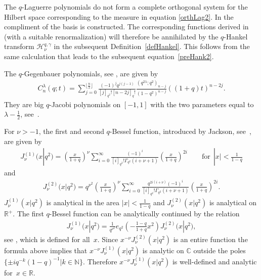 \documentclass[pdftex]{sigma}
\newcommand{\mR}{\mathbb{R}}
\newcommand{\mC}{\mathbb{C}}
\newcommand{\mN}{\mathbb{N}}
\newcommand{\cH}{\mathcal{H}}
\numberwithin{equation}{section}
\begin{document}
\begin{remark}
The $q$-Laguerre polynomials do not form a complete orthogonal system for the Hilbert space corresponding to the measure in equation \eqref{orthLag2}. In \cite{MR1803885} the compliment of the basis is constructed. The corresponding functions derived in~\cite[Section~4]{MR1803885} (with a suitable renormalization) will therefore be annihilated by the $q$-Hankel transform $\cH_\nu^{q,\gamma}$ in the subsequent Def\/inition~\ref{defHankel}. This follows from the same calculation that leads to the subsequent equation~\eqref{preHank2}.
\end{remark}

The $q$-Gegenbauer polynomials, see \cite[equation~(2.19)]{MR1340930}, are given by
\begin{gather}
\label{qGeg}
C^\lambda_n(q;t)=\sum_{j=0}^{\lfloor\frac{n}{2}\rfloor}\frac{(-1)^jq^{j(j-1)}}{[j]_{q^2}![n-2j]_q!}
\frac{(q^{2\lambda};q^2)_{n-j}}{(1-q^2)^{n-j}}((1+q)t)^{n-2j}.
\end{gather}
They are big $q$-Jacobi polynomials on $[-1,1]$ with the two parameters equal to $\lambda-\frac{1}{2}$, see~\cite[equation~(2.26)]{MR1340930}.

For $\nu>-1$, the f\/irst and second $q$-Bessel function, introduced by Jackson, see~\cite{MR0649849, JACKSON}, are given by
\begin{gather}
\label{Bessel1}
J_\nu^{(1)}\big(x|q^2\big)=\left(\frac{x}{1+q}\right)^\nu\sum_{i=0}^\infty\frac{(-1)^i}{[i]_{q^2}!
\Gamma_{q^2}(i+\nu+1)}\left(\frac{x}{1+q}\right)^{2i} \qquad \mbox{for} \ \ |x|<\frac{1}{1-q}
\end{gather}
and
\begin{gather}
\label{Bessel2}
J_\nu^{(2)}\big(x|q^2\big)=q^{\nu^2}\left(\frac{x}{1+q}\right)^\nu\sum_{i=0}^\infty\frac{q^{2i(i+\nu)}(-1)^i}{[i]_{q^2}!
\Gamma_{q^2}(i+\nu+1)}\left(\frac{x}{1+q}\right)^{2i}.
\end{gather}
$J_\nu^{(1)}(x|q^2)$ is analytical in the area $|x|<\frac{1}{1-q}$ and $J_\nu^{(2)}(x|q^2)$ is analytical on $\mR^+$.
The f\/irst $q$-Bessel function can be analytically continued by the relation
\begin{gather*}
J_\nu^{(1)}\big(x|q^2\big) = \frac{1}{q^{\nu^2}}e_{q^2}\left(-\frac{1-q}{1+q}x^2\right)J_{\nu}^{(2)}\big(x|q^2\big),
\end{gather*}
see \cite[Exercise~1.24]{MR1052153}, which is def\/ined for all~$x$. Since $x^{-\nu}J_\nu^{(2)}(x|q^2)$ is an entire function the formula above implies that $x^{-\nu}J_\nu^{(1)}(x|q^2)$ is analytic on $\mC$ outside the poles $\{\pm i q^{-k}(1-q)^{-1}|k\in\mN\}$. Therefore $x^{-\nu}J_\nu^{(1)}(x|q^2)$ is well-def\/ined and analytic for~$x\in\mR$.
\end{document}
